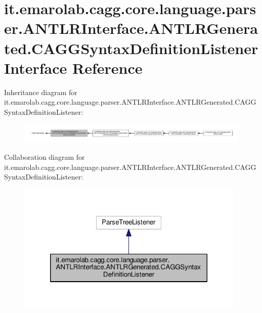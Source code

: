 \hypertarget{interfaceit_1_1emarolab_1_1cagg_1_1core_1_1language_1_1parser_1_1ANTLRInterface_1_1ANTLRGenerate8f089aac366bd2683be460c907cc6185}{\section{it.\-emarolab.\-cagg.\-core.\-language.\-parser.\-A\-N\-T\-L\-R\-Interface.\-A\-N\-T\-L\-R\-Generated.\-C\-A\-G\-G\-Syntax\-Definition\-Listener Interface Reference}
\label{interfaceit_1_1emarolab_1_1cagg_1_1core_1_1language_1_1parser_1_1ANTLRInterface_1_1ANTLRGenerate8f089aac366bd2683be460c907cc6185}
}


Inheritance diagram for it.\-emarolab.\-cagg.\-core.\-language.\-parser.\-A\-N\-T\-L\-R\-Interface.\-A\-N\-T\-L\-R\-Generated.\-C\-A\-G\-G\-Syntax\-Definition\-Listener\-:\nopagebreak
\begin{figure}[H]
\begin{center}
\leavevmode
\includegraphics[width=350pt]{interfaceit_1_1emarolab_1_1cagg_1_1core_1_1language_1_1parser_1_1ANTLRInterface_1_1ANTLRGenerate1785329714366ad3d28b7ccb026cb5ac}
\end{center}
\end{figure}


Collaboration diagram for it.\-emarolab.\-cagg.\-core.\-language.\-parser.\-A\-N\-T\-L\-R\-Interface.\-A\-N\-T\-L\-R\-Generated.\-C\-A\-G\-G\-Syntax\-Definition\-Listener\-:\nopagebreak
\begin{figure}[H]
\begin{center}
\leavevmode
\includegraphics[width=310pt]{interfaceit_1_1emarolab_1_1cagg_1_1core_1_1language_1_1parser_1_1ANTLRInterface_1_1ANTLRGenerateb18dccd22decaa46b8bb712b231d2f2a}
\end{center}
\end{figure}

